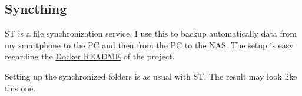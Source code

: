 

\subsection{Syncthing}

\gls{ST} is a file synchronization service. I use this to backup automatically
data from my smartphone to the PC and then from the PC to the NAS. The setup
is easy regarding the \href{https://github.com/syncthing/syncthing/blob/main/README-Docker.md}{Docker README}
of the project. 

Setting up the synchronized folders is as usual with \gls{ST}. The result
may look like this one.

